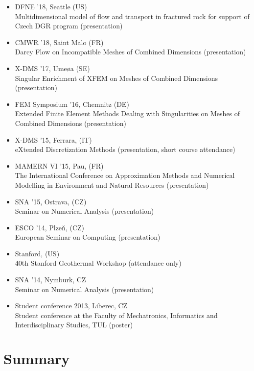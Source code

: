 \documentclass[bibliography=totocnumbered,dvipsnames,FM,Dis]{tulthesis}
\begin{document}
\begin{itemize}[label={}]
\item DFNE '18, Seattle (US) \\ Multidimensional model of flow and transport in fractured
rock for support of Czech DGR program (presentation)
\item CMWR '18, Saint Malo (FR) \\ Darcy Flow on Incompatible Meshes of
Combined Dimensions (presentation)
\item X-DMS '17, Ume{\o a} (SE) \\ Singular Enrichment of XFEM on Meshes of
Combined Dimensions (presentation)
\item FEM Symposium '16, Chemnitz (DE) \\ Extended Finite Element Methods Dealing with Singularities on Meshes of Combined Dimensions (presentation)
\item X-DMS '15, Ferrara, (IT) \\ eXtended Discretization Methods (presentation, short course attendance)
\item MAMERN VI '15, Pau, (FR) \\ The International Conference on Approximation Methods and Numerical Modelling in Environment and Natural Resources (presentation)
\item SNA '15, Ostrava, (CZ) \\ Seminar on Numerical Analysis (presentation)
\item ESCO '14, Plze{\v n}, (CZ) \\ European Seminar on Computing (presentation)
\item Stanford, (US) \\ 40th Stanford Geothermal Workshop (attendance only)
\item SNA '14, Nymburk, CZ \\ Seminar on Numerical Analysis (presentation)
\item Student conference 2013, Liberec, CZ \\ Student conference at the Faculty of Mechatronics, Informatics and Interdisciplinary Studies, TUL (poster)
\end{itemize}



\chapter{Summary} \label{chap:summary}
\end{document}
